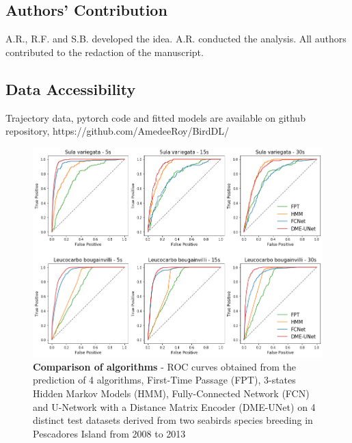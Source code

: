 \documentclass{article}
\begin{document}
\subsection*{Authors' Contribution}
A.R., R.F. and S.B. developed the idea. A.R. conducted the analysis. All authors contributed to the redaction of the manuscript.

\subsection*{Data Accessibility}
Trajectory data, pytorch code and fitted models are available on github repository, https://github.com/AmedeeRoy/BirdDL/




\newpage

\begin{figure}[h]
  \centering
  \includegraphics[scale=0.5]{figure1.png}
  \caption{\textbf{Comparison of algorithms} - ROC curves obtained from the prediction of 4 algorithms, First-Time Passage (FPT), 3-states Hidden Markov Models (HMM), Fully-Connected Network (FCN) and U-Network with a Distance Matrix Encoder (DME-UNet) on 4 distinct test datasets derived from two seabirds species breeding in Pescadores Island from 2008 to 2013}
  \label{figure1}
\end{figure}
\end{document}
